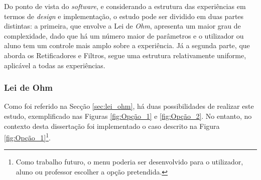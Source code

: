 




Do ponto de vista do \textit{software}, e considerando a estrutura das experiências em termos de \textit{design} e implementação, o estudo pode ser dividido em duas partes distintas: a primeira, que envolve a Lei de \textit{Ohm}, apresenta um maior grau de complexidade, dado que há um número maior de parâmetros e o utilizador ou aluno tem um controle mais amplo sobre a experiência. Já a segunda parte, que aborda os Retificadores e Filtros, segue uma estrutura relativamente uniforme, aplicável a todas as experiências.

\subsubsection{Lei de Ohm}
Como foi referido na Secção \ref{sec:lei_ohm}, há duas possibilidades de realizar este estudo, exemplificado nas Figuras \ref{fig:Opção_1} e \ref{fig:Opção_2}. No entanto, no contexto desta dissertação foi  implementado o caso descrito na Figura \ref{fig:Opção_1}\footnote{Como trabalho futuro, o menu poderia ser desenvolvido para o utilizador, aluno ou professor escolher a opção pretendida.}. 


